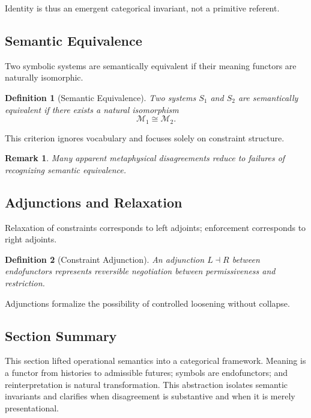 \documentclass[11pt]{article}
\newtheorem{definition}{Definition}
\newtheorem{remark}{Remark}
\begin{document}
Identity is thus an emergent categorical invariant, not a primitive referent.

\subsection{Semantic Equivalence}

Two symbolic systems are semantically equivalent if their meaning functors are
naturally isomorphic.

\begin{definition}[Semantic Equivalence]
Two systems $S_1$ and $S_2$ are semantically equivalent if there exists a natural
isomorphism
\[
\mathcal{M}_1 \cong \mathcal{M}_2.
\]
\end{definition}

This criterion ignores vocabulary and focuses solely on constraint structure.

\begin{remark}
Many apparent metaphysical disagreements reduce to failures of recognizing
semantic equivalence.
\end{remark}

\subsection{Adjunctions and Relaxation}

Relaxation of constraints corresponds to left adjoints; enforcement corresponds
to right adjoints.

\begin{definition}[Constraint Adjunction]
An adjunction $L \dashv R$ between endofunctors represents reversible negotiation
between permissiveness and restriction.
\end{definition}

Adjunctions formalize the possibility of controlled loosening without collapse.

\subsection{Section Summary}

This section lifted operational semantics into a categorical framework. Meaning is
a functor from histories to admissible futures; symbols are endofunctors; and
reinterpretation is natural transformation. This abstraction isolates semantic
invariants and clarifies when disagreement is substantive and when it is merely
presentational.
\end{document}
